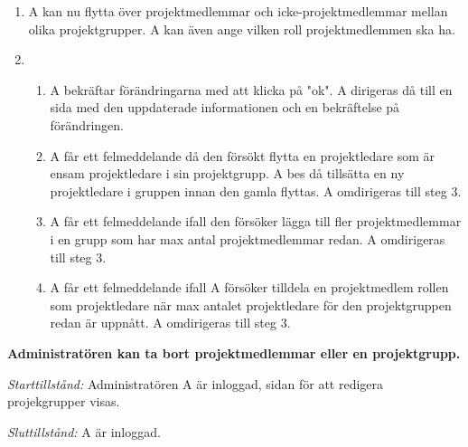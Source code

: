 \documentclass[a4paper]{article}
\begin{document}
\begin{ST}
\begin{enumerate}
\item A kan nu flytta över projektmedlemmar och icke-projektmedlemmar mellan olika projektgrupper. A kan även ange vilken roll projektmedlemmen ska ha.
\item 
\begin{enumerate}
\item A bekräftar förändringarna med att klicka på "ok". A dirigeras då till en sida med den uppdaterade informationen och en bekräftelse på förändringen.
\item A får ett felmeddelande då den försökt flytta en projektledare som är ensam projektledare i sin projektgrupp. A bes då tillsätta en ny projektledare i gruppen innan den gamla flyttas. A omdirigeras till steg 3.
\item A får ett felmeddelande ifall den försöker lägga till fler projektmedlemmar i en grupp som har max antal projektmedlemmar redan. A omdirigeras till steg 3.
\item A får ett felmeddelande ifall A försöker tilldela en projektmedlem rollen som projektledare när max antalet projektledare för den projektgruppen redan är uppnått. A omdirigeras till steg 3.
\end{enumerate}
\end{enumerate}

\item
\textbf{Administratören kan ta bort projektmedlemmar eller en projektgrupp.}

\emph{Starttillstånd:} Administratören A är inloggad, sidan för att redigera projekgrupper visas.

\emph{Sluttillstånd:} A är inloggad.


\end{ST}
\end{document}
